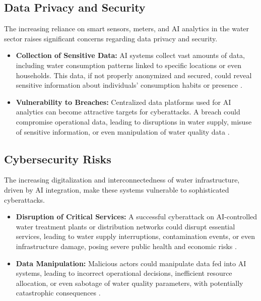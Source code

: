 \subsection{Data Privacy and Security}
The increasing reliance on smart sensors, meters, and AI analytics in the water sector raises significant concerns regarding data privacy and security.
\begin{itemize}
    \item \textbf{Collection of Sensitive Data:} AI systems collect vast amounts of data, including water consumption patterns linked to specific locations or even households. This data, if not properly anonymized and secured, could reveal sensitive information about individuals' consumption habits or presence \cite{AWA_Risks}.
    \item \textbf{Vulnerability to Breaches:} Centralized data platforms used for AI analytics can become attractive targets for cyberattacks. A breach could compromise operational data, leading to disruptions in water supply, misuse of sensitive information, or even manipulation of water quality data \cite{Trinnex_Risks}.
\end{itemize}

\subsection{Cybersecurity Risks}
The increasing digitalization and interconnectedness of water infrastructure, driven by AI integration, make these systems vulnerable to sophisticated cyberattacks.
\begin{itemize}
    \item \textbf{Disruption of Critical Services:} A successful cyberattack on AI-controlled water treatment plants or distribution networks could disrupt essential services, leading to water supply interruptions, contamination events, or even infrastructure damage, posing severe public health and economic risks \cite{WaterOnline_Risks}.
    \item \textbf{Data Manipulation:} Malicious actors could manipulate data fed into AI systems, leading to incorrect operational decisions, inefficient resource allocation, or even sabotage of water quality parameters, with potentially catastrophic consequences \cite{Winssolutions_Risks}.
\end{itemize}

